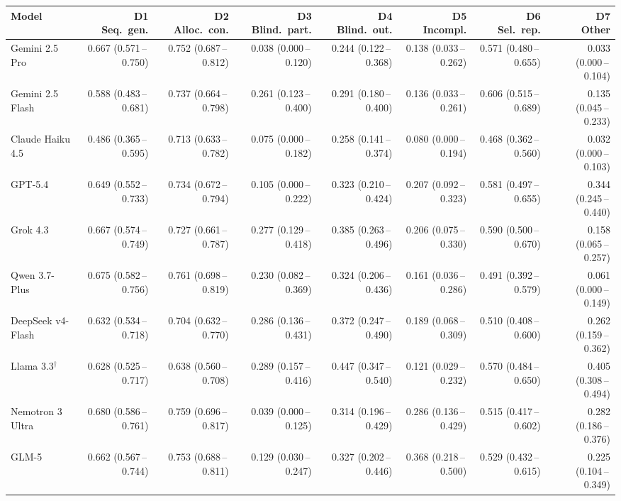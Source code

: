 \begin{tabular}{lrrrrrrr}
\toprule
Model & \makecell{D1\\Seq.\ gen.} & \makecell{D2\\Alloc.\ con.} & \makecell{D3\\Blind.\ part.} & \makecell{D4\\Blind.\ out.} & \makecell{D5\\Incompl.} & \makecell{D6\\Sel.\ rep.} & \makecell{D7\\Other} \\
\midrule
Gemini 2.5 Pro & 0.667 (0.571\,--\,0.750) & 0.752 (0.687\,--\,0.812) & 0.038 (0.000\,--\,0.120) & 0.244 (0.122\,--\,0.368) & 0.138 (0.033\,--\,0.262) & 0.571 (0.480\,--\,0.655) & 0.033 (0.000\,--\,0.104) \\
Gemini 2.5 Flash & 0.588 (0.483\,--\,0.681) & 0.737 (0.664\,--\,0.798) & 0.261 (0.123\,--\,0.400) & 0.291 (0.180\,--\,0.400) & 0.136 (0.033\,--\,0.261) & 0.606 (0.515\,--\,0.689) & 0.135 (0.045\,--\,0.233) \\
Claude Haiku 4.5 & 0.486 (0.365\,--\,0.595) & 0.713 (0.633\,--\,0.782) & 0.075 (0.000\,--\,0.182) & 0.258 (0.141\,--\,0.374) & 0.080 (0.000\,--\,0.194) & 0.468 (0.362\,--\,0.560) & 0.032 (0.000\,--\,0.103) \\
GPT-5.4 & 0.649 (0.552\,--\,0.733) & 0.734 (0.672\,--\,0.794) & 0.105 (0.000\,--\,0.222) & 0.323 (0.210\,--\,0.424) & 0.207 (0.092\,--\,0.323) & 0.581 (0.497\,--\,0.655) & 0.344 (0.245\,--\,0.440) \\
Grok 4.3 & 0.667 (0.574\,--\,0.749) & 0.727 (0.661\,--\,0.787) & 0.277 (0.129\,--\,0.418) & 0.385 (0.263\,--\,0.496) & 0.206 (0.075\,--\,0.330) & 0.590 (0.500\,--\,0.670) & 0.158 (0.065\,--\,0.257) \\
Qwen 3.7-Plus & 0.675 (0.582\,--\,0.756) & 0.761 (0.698\,--\,0.819) & 0.230 (0.082\,--\,0.369) & 0.324 (0.206\,--\,0.436) & 0.161 (0.036\,--\,0.286) & 0.491 (0.392\,--\,0.579) & 0.061 (0.000\,--\,0.149) \\
DeepSeek v4-Flash & 0.632 (0.534\,--\,0.718) & 0.704 (0.632\,--\,0.770) & 0.286 (0.136\,--\,0.431) & 0.372 (0.247\,--\,0.490) & 0.189 (0.068\,--\,0.309) & 0.510 (0.408\,--\,0.600) & 0.262 (0.159\,--\,0.362) \\
Llama 3.3$^\dagger$ & 0.628 (0.525\,--\,0.717) & 0.638 (0.560\,--\,0.708) & 0.289 (0.157\,--\,0.416) & 0.447 (0.347\,--\,0.540) & 0.121 (0.029\,--\,0.232) & 0.570 (0.484\,--\,0.650) & 0.405 (0.308\,--\,0.494) \\
Nemotron 3 Ultra & 0.680 (0.586\,--\,0.761) & 0.759 (0.696\,--\,0.817) & 0.039 (0.000\,--\,0.125) & 0.314 (0.196\,--\,0.429) & 0.286 (0.136\,--\,0.429) & 0.515 (0.417\,--\,0.602) & 0.282 (0.186\,--\,0.376) \\
GLM-5 & 0.662 (0.567\,--\,0.744) & 0.753 (0.688\,--\,0.811) & 0.129 (0.030\,--\,0.247) & 0.327 (0.202\,--\,0.446) & 0.368 (0.218\,--\,0.500) & 0.529 (0.432\,--\,0.615) & 0.225 (0.104\,--\,0.349) \\
\bottomrule
\end{tabular}